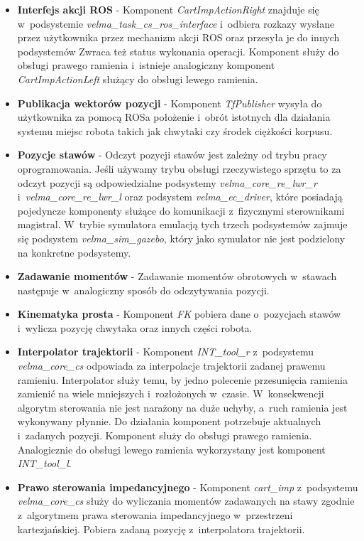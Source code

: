 \begin{itemize}
	\item \textbf{Interfejs akcji ROS} - 
	Komponent \textit{CartImpActionRight} znajduje się w~podsystemie \textit{velma\_task\_cs\_ros\_interface} i~odbiera rozkazy wysłane przez użytkownika przez mechanizm akcji ROS oraz przesyła je do innych podsystemów Zwraca też status wykonania operacji. Komponent służy do obsługi prawego ramienia i~istnieje analogiczny komponent \textit{CartImpActionLeft} służący do obsługi lewego ramienia.
	\item \textbf{Publikacja wektorów pozycji} - 
	Komponent \textit{TfPublisher} wysyła do użytkownika za pomocą ROSa położenie i~obrót istotnych dla działania systemu miejsc robota takich jak chwytaki czy środek ciężkości korpusu. 
	\item \textbf{Pozycje stawów} - 
	Odczyt pozycji stawów jest zależny od trybu pracy oprogramowania. Jeśli używamy trybu obsługi rzeczywistego sprzętu to za odczyt pozycji są odpowiedzialne podsystemy \textit{velma\_core\_re\_lwr\_r} i~\textit{velma\_core\_re\_lwr\_l} oraz podsystem \textit{velma\_ec\_driver}, które posiadają pojedyncze komponenty służące do komunikacji z~fizycznymi sterownikami magistral. W~trybie symulatora emulacją tych trzech podsystemów zajmuje się podsystem \textit{velma\_sim\_gazebo}, który jako symulator nie jest podzielony na konkretne podsystemy.
	\item \textbf{Zadawanie momentów} - 
	Zadawanie momentów obrotowych w~stawach następuje w~analogiczny sposób do odczytywania pozycji.
	\item \textbf{Kinematyka prosta} - 
	Komponent \textit{FK} pobiera dane o~pozycjach stawów i~wylicza pozycję chwytaka oraz innych części robota.
	\item \textbf{Interpolator trajektorii} - 
	Komponent \textit{INT\_tool\_r} z~podsystemu \textit{velma\_core\_cs} odpowiada za interpolacje trajektorii zadanej prawemu ramieniu. Interpolator służy temu, by jedno polecenie przesunięcia ramienia zamienić na wiele mniejszych i~rozłożonych w~czasie. W~konsekwencji algorytm sterowania nie jest narażony na duże uchyby, a~ruch ramienia jest wykonywany płynnie. Do działania komponent potrzebuje aktualnych i~zadanych pozycji. Komponent służy do obsługi prawego ramienia. Analogicznie do obsługi lewego ramienia wykorzystany jest komponent \textit{INT\_tool\_l}.
	
	\item \textbf{Prawo sterowania impedancyjnego} - 
	Komponent \textit{cart\_imp} z~podsystemu \textit{velma\_core\_cs} służy do wyliczania momentów zadawanych na stawy zgodnie z~algorytmem prawa sterowania impedancyjnego w~przestrzeni kartezjańskiej. Pobiera zadaną pozycję z~interpolatora trajektorii.
\end{itemize}


